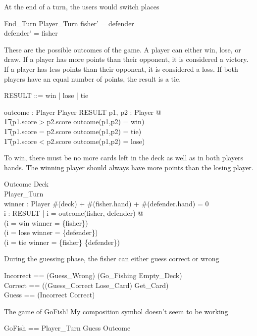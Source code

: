 \documentclass{article}
\begin{document}
At the end of a turn, the users would switch places
\begin{schema}{End\_Turn}
    \Delta Player\_Turn
    \where
    fisher' = defender \\
    defender' = fisher
\end{schema}
\clearpage
These are the possible outcomes of the game. A player can
either win, lose, or draw. If a player has more points than their
opponent, it is considered a victory. If a player has less points
than their opponent, it is considered a loss. If both players have
an equal number of points, the result is a tie.
\begin{zed}
    RESULT ::= win | lose | tie
\end{zed}

\begin{axdef}
    outcome : Player \cross Player \fun RESULT
    \where
    \forall p1, p2 : Player @\\
    \t1 (p1.score > p2.score \land outcome(p1,p2) = win) \lor \\
    \t1 (p1.score = p2.score \land outcome(p1,p2) = tie) \lor \\
    \t1 (p1.score < p2.score \land outcome(p1,p2) = lose)
\end{axdef}

To win, there must be no more cards left in the deck as well as
in both players hands. The winning player should always have more
points than the losing player.
\begin{schema}{Outcome}
    Deck \\
    Player\_Turn\\
    winner : \power Player
    \where
    \#(deck) + \#(fisher.hand) + \#(defender.hand) = 0 \\
    \forall i : RESULT | i = outcome(fisher, defender) @\\
    (i = win \land winner = \{fisher\}) \lor \\
    (i = lose \land winner = \{defender\}) \lor \\
    (i = tie \land winner = \{fisher\} \cup \{defender\})
\end{schema}

During the guessing phase, the fisher can either guess correct or wrong
\begin{zed}
    Incorrect == (Guess\_Wrong) \land (Go\_Fishing \lor Empty\_Deck)\\
    Correct == ((Guess\_Correct \pipe Lose\_Card) \pipe Get\_Card) \\
    Guess == (Incorrect \lor Correct)
\end{zed}

The game of GoFish! My composition symbol doesn't seem to be working
\begin{zed}
    GoFish == Player\_Turn \semi Guess \lor Outcome\\
\end{zed}
    
\end{document}
